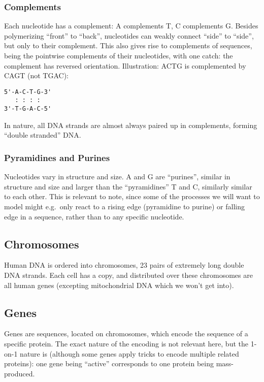 \documentclass[fleqn]{book}
\begin{document}
\subsubsection{Complements}\label{complements}

Each nucleotide has a complement: A complements T, C complements G.
Besides polymerizing ``front'' to ``back'', nucleotides can weakly
connect ``side'' to ``side'', but only to their complement. This also
gives rise to complements of sequences, being the pointwise complements
of their nucleotides, with one catch: the complement has reversed
orientation. Illustration: ACTG is complemented by CAGT (not TGAC):

\begin{verbatim}
5'-A-C-T-G-3'
   : : : :
3'-T-G-A-C-5'
\end{verbatim}

In nature, all DNA strands are almost always paired up in complements,
forming ``double stranded'' DNA.

\subsubsection{Pyramidines and Purines}\label{pyramidines-and-purines}

Nucleotides vary in structure and size. A and G are ``purines'', similar
in structure and size and larger than the ``pyramidines'' T and C,
similarly similar to each other. This is relevant to note, since some of
the processes we will want to model might e.g.~only react to a rising
edge (pyramidine to purine) or falling edge in a sequence, rather than
to any specific nucleotide.

\subsection{Chromosomes}\label{chromosomes}

Human DNA is ordered into chromosomes, 23 pairs of extremely long double
DNA strands. Each cell has a copy, and distributed over these
chromosomes are all human genes (excepting mitochondrial DNA which we
won't get into).

\subsection{Genes}\label{genes}

Genes are sequences, located on chromosomes, which encode the sequence
of a specific protein. The exact nature of the encoding is not relevant
here, but the 1-on-1 nature is (although some genes apply tricks to
encode multiple related proteins): one gene being ``active'' corresponds
to one protein being mass-produced.
\end{document}

